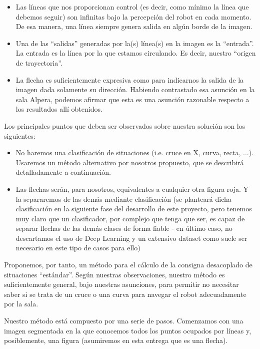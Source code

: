 \documentclass{article}
\begin{document}
    \begin{itemize}
        \item Las líneas que nos proporcionan control (es decir, como mínimo la línea que debemos seguir) son infinitas bajo la percepción del robot en cada momento. De esa manera, una línea siempre genera salida en algún borde de la imagen.
        \item Una de las ``salidas'' generadas por la(s) línea(s) en la imagen es la ``entrada''. La entrada es la línea por la que estamos circulando. Es decir, nuestro ``origen de trayectoria''.
        \item La flecha es suficientemente expresiva como para indicarnos la salida de la imagen dada solamente su dirección. Habiendo contrastado esa asunción en la sala Alpera, podemos afirmar que esta es una asunción razonable respecto a los resultados allí obtenidos.
    \end{itemize}

    Los principales puntos que deben ser observados sobre nuestra solución son los siguientes:
    \begin{itemize}
        \item No haremos una clasificación de situaciones (i.e. cruce en X, curva, recta, ...). Usaremos un método alternativo por nosotros propuesto, que se describirá detalladamente a continuación.
        \item Las flechas serán, para nosotros, equivalentes a cualquier otra figura roja. Y la separaremos de las demás mediante clasificación (se planteará dicha clasificación en la siguiente fase del desarrollo de este proyecto, pero tenemos muy claro que un clasificador, por complejo que tenga que ser, es capaz de separar flechas de las demás clases de forma fiable - en último caso, no descartamos el uso de Deep Learning y un extensivo dataset como suele ser necesario en este tipo de casos para ello)
    \end{itemize}

    Proponemos, por tanto, un método para el cálculo de la consigna desacoplado de situaciones ``estándar''. Según nuestras observaciones, nuestro método es suficientemente general, bajo nuestras asunciones, para permitir no necesitar saber si se trata de un cruce o una curva para navegar el robot adecuadamente por la sala.

    Nuestro método está compuesto por una serie de pasos. Comenzamos con una imagen segmentada en la que conocemos todos los puntos ocupados por líneas y, posiblemente, una figura (asumiremos en esta entrega que es una flecha).
\end{document}
